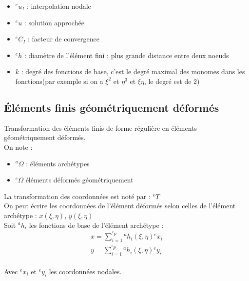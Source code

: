 \documentclass[../main.tex]{subfiles}
\begin{document}
\begin{itemize}
    \item ${}^eu_I$ : interpolation nodale\\
    \item ${}^eu$ : solution approchée\\
    \item ${}^eC_I$ : facteur de convergence\\
    \item ${}^eh$ : diamètre de l'élément fini : plus grande distance entre deux noeuds\\
    \item $k$ : degré des fonctions de base, c'est le degré maximal des monomes dans les fonctions(par exemple si on a $\xi^2$ et $\eta^3$ et $\xi \eta$, le degré est de 2)\\
\end{itemize}

\subsection{Éléments finis géométriquement déformés}
Transformation des éléments finis de forme régulière en éléments géométriquement déformés.\\

On note : \begin{itemize}
    \item ${}^a\Omega$ : éléments archétypes\\
    \item ${}^e \Omega$ éléments déformés géométriquement\\
\end{itemize}

La transformation des coordonnées est noté par : ${}^e T$\\
On peut écrire les coordonnées de l'élément déformés selon celles de l'élément archétype : $x(\xi,\eta)$, $y(\xi, \eta)$\\

Soit ${}^ah_i$ les fonctions de base de l'élément archétype : \begin{equation} \begin{gathered}
    x = \sum_{i=1}^{{}^ep} {}^ah_i(\xi, \eta) {}^ex_i\\
    y = \sum_{i=1}^{{}^ep} {}^ah_i(\xi, \eta) {}^ey_i\\
    \end{gathered}
\end{equation}

Avec ${}^ex_i$ et ${}^ey_i$ les coordonnées nodales.\\
\end{document}
